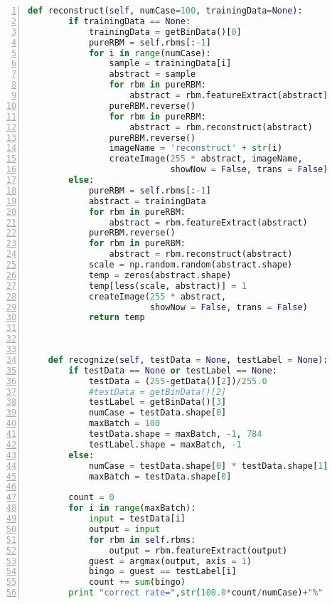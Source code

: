 \begin{lstlisting}[language=Python,numbers=left, frame=shadowbox, rulesepcolor=\color{cadegrey}, caption=\text{DBNs.py}]
    def reconstruct(self, numCase=100, trainingData=None):
        if trainingData == None:
            trainingData = getBinData()[0]
            pureRBM = self.rbms[:-1]
            for i in range(numCase):
                sample = trainingData[i]
                abstract = sample
                for rbm in pureRBM:
                    abstract = rbm.featureExtract(abstract)
                pureRBM.reverse()
                for rbm in pureRBM:
                    abstract = rbm.reconstruct(abstract)
                pureRBM.reverse()
                imageName = 'reconstruct' + str(i)
                createImage(255 * abstract, imageName, 
                            showNow = False, trans = False)
        else:
            pureRBM = self.rbms[:-1]
            abstract = trainingData
            for rbm in pureRBM:
                abstract = rbm.featureExtract(abstract)
            pureRBM.reverse()
            for rbm in pureRBM:
                abstract = rbm.reconstruct(abstract)
            scale = np.random.random(abstract.shape)
            temp = zeros(abstract.shape)
            temp[less(scale, abstract)] = 1
            createImage(255 * abstract, 
                        showNow = False, trans = False)
            return temp
    
    
    
    def recognize(self, testData = None, testLabel = None):
        if testData == None or testLabel == None:
            testData = (255-getData()[2])/255.0
            #testData = getBinData()[2]
            testLabel = getBinData()[3]
            numCase = testData.shape[0]
            maxBatch = 100
            testData.shape = maxBatch, -1, 784
            testLabel.shape = maxBatch, -1
        else:
            numCase = testData.shape[0] * testData.shape[1]
            maxBatch = testData.shape[0] 
            
        count = 0
        for i in range(maxBatch):
            input = testData[i]
            output = input
            for rbm in self.rbms:
                output = rbm.featureExtract(output)
            guest = argmax(output, axis = 1)
            bingo = guest == testLabel[i]
            count += sum(bingo)
        print "correct rate=",str(100.0*count/numCase)+"%"
\end{lstlisting}

